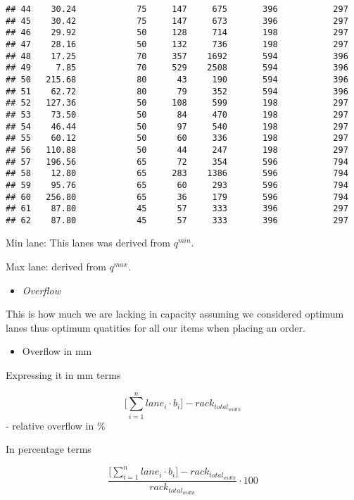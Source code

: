 \documentclass[
]{article}
\providecommand{\tightlist}{%
  \setlength{\itemsep}{0pt}\setlength{\parskip}{0pt}}
\begin{document}
\begin{verbatim}
## 44    30.24            75     147     675       396           297
## 45    30.42            75     147     673       396           297
## 46    29.92            50     128     714       198           297
## 47    28.16            50     132     736       198           297
## 48    17.25            70     357    1692       594           396
## 49     7.85            70     529    2508       594           396
## 50   215.68            80      43     190       594           396
## 51    62.72            80      79     352       594           396
## 52   127.36            50     108     599       198           297
## 53    73.50            50      84     470       198           297
## 54    46.44            50      97     540       198           297
## 55    60.12            50      60     336       198           297
## 56   110.88            50      44     247       198           297
## 57   196.56            65      72     354       596           794
## 58    12.80            65     283    1386       596           794
## 59    95.76            65      60     293       596           794
## 60   256.80            65      36     179       596           794
## 61    87.80            45      57     333       396           297
## 62    87.80            45      57     333       396           297
\end{verbatim}

Min lane: This lanes was derived from \(q^{min}\).

Max lane: derived from \(q^{max}\).

\begin{itemize}
\tightlist
\item
  \emph{Overflow}
\end{itemize}

This is how much we are lacking in capacity assuming we considered
optimum lanes thus optimum quatities for all our items when placing an
order.

\begin{itemize}
\tightlist
\item
  Overflow in mm
\end{itemize}

Expressing it in mm terms

\[\Bigg[ \sum_{i=1}^n lane_i \cdot b_i \Bigg]- rack_{{total}_{width}}\]
- relative overflow in \%

In percentage terms

\[\frac{\big[\sum_{i=1}^n lane_i \cdot b_i \big]- rack_{{total}_{width}}} {rack_{{total}_{width}} } \cdot 100\]
\end{document}
